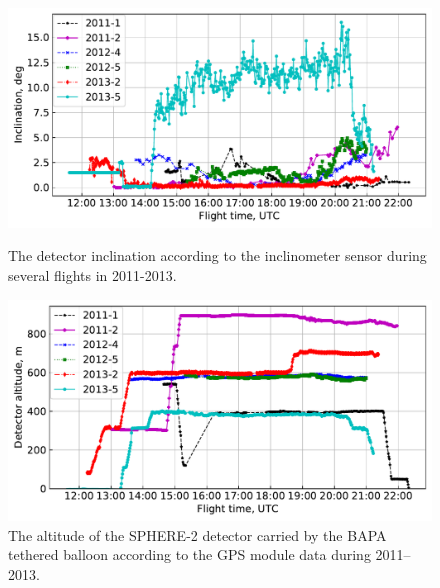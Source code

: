 \documentclass[final,5p,times,twocolumn]{elsarticle}
\begin{document}
\begin{figure}[tb]
    \begin{minipage}[t]{0.48\textwidth}
    \centering
    \includegraphics[width=\textwidth]{Telemetry_inclination.pdf}
    \caption{The detector inclination according to the inclinometer sensor during several flights in 2011-2013.}
    \label{fig:inclination} 
    \end{minipage}
    \hfill
    \begin{minipage}[t]{0.48\textwidth}
    \centering
    \includegraphics[width=\textwidth]{Telemetry_height.pdf}
    \caption{The altitude of the SPHERE-2 detector carried by the BAPA tethered balloon according to the GPS module data during 2011--2013.}
    \label{fig:height}
    \end{minipage}
    
    \vspace{\baselineskip}
    

\end{figure}
\end{document}
